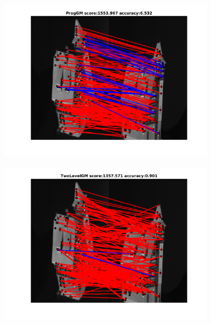 \documentclass[
	fontsize=12pt,
	paper=a4,
	twoside=false,
	numbers=noenddot,
	plainheadsepline,
	toc=listof,
	toc=bibliography
]{scrartcl}
\begin{document}
\begin{figure}[h!] 
	\begin{subfigure}[b]{0.3\textwidth}
		\centering
		\includegraphics[scale=0.25]{"fig_ver2608/RealImages/HouseSeq/anchor_descr/using_cpd_afftrafo/solution/fi_11_ProgGM"}  
	\end{subfigure}%
	\begin{subfigure}[b]{0.3\textwidth}
		\centering
		\includegraphics[scale=0.25]{"fig_ver2608/RealImages/HouseSeq/anchor_descr/using_cpd_afftrafo/solution/fi_11_TwoLevelGM"}  
	\end{subfigure} 
	\begin{subfigure}[b]{0.3\textwidth}
		\centering

\end{subfigure}
\end{figure}
\end{document}
